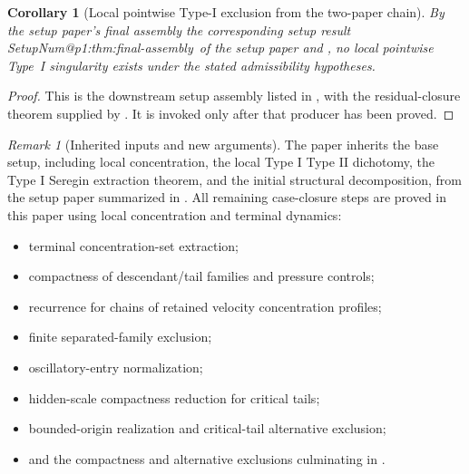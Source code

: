 \documentclass[11pt]{amsart}
\makeatletter
\numberwithin{equation}{section}
\theoremstyle{plain}
\newtheorem{corollary}[corollary]{Corollary}
\theoremstyle{definition}
\theoremstyle{remark}
\newtheorem{remark}[remark]{Remark}
\newcommand{\SetupLabel}[1]{%
   \@ifundefined{SetupNum@#1}%
      {\textup{the corresponding setup result}}%
      {\csname SetupNum@#1\endcsname\ of the setup paper}%
}
\makeatother
\begin{document}
\begin{corollary}[Local pointwise Type-I exclusion from the two-paper chain]
\label{cor:two-paper-local-typeI-exclusion}
By the setup paper's final assembly
\SetupLabel{p1:thm:final-assembly} and
, no local pointwise Type~I
singularity exists under the stated admissibility hypotheses.
\end{corollary}

\begin{proof}
This is the downstream setup assembly listed in
, with the residual-closure theorem supplied
by .  It is invoked only after that
producer has been proved.
\end{proof}

\begin{remark}[Inherited inputs and new arguments]
\label{rem:imported-vs-proved}
The paper inherits the base setup, including local concentration, the local Type I
Type II dichotomy, the Type I Seregin extraction theorem, and the initial
structural decomposition, from the setup paper summarized in
.  All remaining case-closure steps are proved in this
paper using local concentration and terminal dynamics:
\begin{itemize}
\item terminal concentration-set extraction;
\item compactness of descendant/tail families and pressure controls;
\item recurrence for chains of retained velocity concentration profiles;
\item finite separated-family exclusion;
\item oscillatory-entry normalization;
\item hidden-scale compactness reduction for critical tails;
\item bounded-origin realization and critical-tail alternative exclusion;
\item and the compactness and alternative exclusions culminating in
 .
\end{itemize}
\end{remark}
\end{document}
